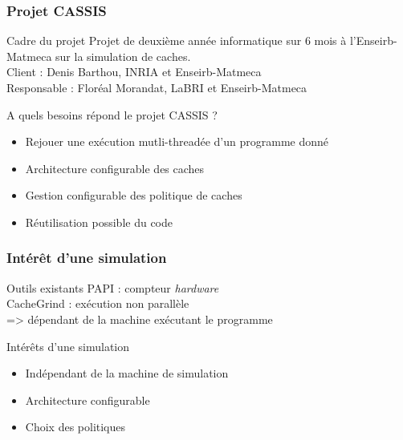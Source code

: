 \begin{frame}
  \frametitle{Projet CASSIS}
  \begin{block}{Cadre du projet}
    Projet de deuxième année informatique sur 6 mois à l'Enseirb-Matmeca sur la simulation de caches.\\
    Client : Denis Barthou, INRIA et Enseirb-Matmeca\\
    Responsable : Floréal Morandat, LaBRI et Enseirb-Matmeca
  \end{block}
  \begin{block}{A quels besoins répond le projet CASSIS ?}
  \begin{itemize}  
  \item Rejouer une exécution mutli-threadée d'un programme donné
  \item Architecture configurable des caches
  \item Gestion configurable des politique de caches 
  \item Réutilisation possible du code
  \end{itemize}
  \end{block}
\end{frame}

\begin{frame}
  \frametitle{Intérêt d'une simulation}
  \begin{block}{Outils existants}
    PAPI : compteur \emph{hardware}\\
    CacheGrind : exécution non parallèle\\
    => dépendant de la machine exécutant le programme
  \end{block}

  \begin{block}{Intérêts d'une simulation}
    \begin{itemize}
    \item Indépendant de la machine de simulation
    \item Architecture configurable
    \item Choix des politiques
    \end{itemize}
  \end{block}
\end{frame}
